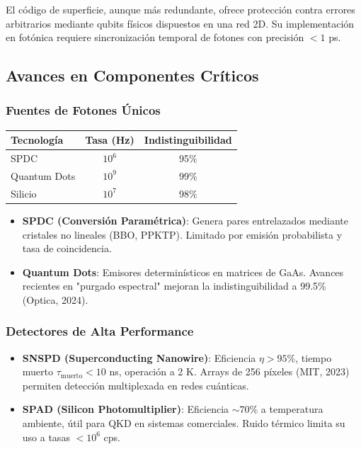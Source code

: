\documentclass{article}
\begin{document}
El código de superficie, aunque más redundante, ofrece protección contra errores arbitrarios mediante qubits físicos dispuestos en una red 2D. Su implementación en fotónica requiere sincronización temporal de fotones con precisión $<1$ ps.

\subsection*{Avances en Componentes Críticos}

\subsubsection*{Fuentes de Fotones Únicos}

\begin{table}[h]
\centering
\small
\begin{tabular}{|l|c|c|}
\hline
\textbf{Tecnología} & \textbf{Tasa (Hz)} & \textbf{Indistinguibilidad} \\
\hline
SPDC & $10^6$ & 95\% \\
Quantum Dots & $10^9$ & 99\% \\
Silicio & $10^7$ & 98\% \\
\hline
\end{tabular}
\end{table}

\begin{itemize}
    \item \textbf{SPDC (Conversión Paramétrica)}: Genera pares entrelazados mediante cristales no lineales (BBO, PPKTP). Limitado por emisión probabilista y tasa de coincidencia.
    \item \textbf{Quantum Dots}: Emisores determinísticos en matrices de GaAs. Avances recientes en "purgado espectral" mejoran la indistinguibilidad a 99.5\% (Optica, 2024).
\end{itemize}

\subsubsection*{Detectores de Alta Performance}

\begin{itemize}
    \item \textbf{SNSPD (Superconducting Nanowire)}: Eficiencia $\eta > 95\%$, tiempo muerto $\tau_{\text{muerto}} < 10$ ns, operación a 2 K. Arrays de 256 píxeles (MIT, 2023) permiten detección multiplexada en redes cuánticas.
    \item \textbf{SPAD (Silicon Photomultiplier)}: Eficiencia $\sim70\%$ a temperatura ambiente, útil para QKD en sistemas comerciales. Ruido térmico limita su uso a tasas $<10^6$ cps.
\end{itemize}
\end{document}
